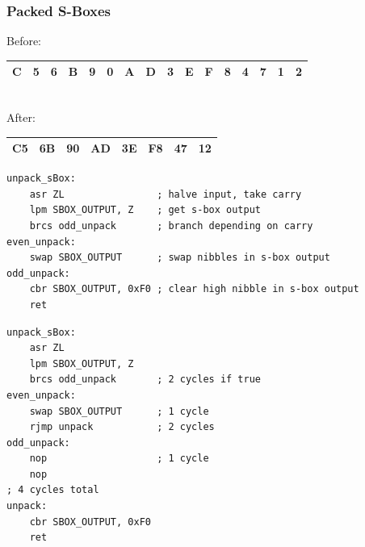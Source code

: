 \documentclass{beamer}
\begin{document}
\begin{frame}[fragile]
\frametitle{Packed S-Boxes}
	\footnotesize{
	Before: \\
	\begin{tabular}{ | C | C | C | C | C | C | C | C | C | C | C | C | C | C | C | C | }
	  \hline                        
	  C & 5 & 6 & B & 9 & 0 & A & D & 3 & E & F & 8 & 4 & 7 & 1 & 2 \\
	  \hline  
	\end{tabular}
	\pause \\

	After: \\
	\begin{tabular}{ | C | C | C | C | C | C | C | C | }
	  \hline                        
	  C5 & 6B & 90 & AD & 3E & F8 & 47 & 12 \\
	  \hline  
	\end{tabular}
	}
\pause
\begin{overprint}
\begin{lstlisting}
unpack_sBox:
    asr ZL                ; halve input, take carry
    lpm SBOX_OUTPUT, Z    ; get s-box output
    brcs odd_unpack       ; branch depending on carry
even_unpack:
    swap SBOX_OUTPUT      ; swap nibbles in s-box output
odd_unpack:
    cbr SBOX_OUTPUT, 0xF0 ; clear high nibble in s-box output
    ret
\end{lstlisting}
\begin{lstlisting}
unpack_sBox:
    asr ZL
    lpm SBOX_OUTPUT, Z
    brcs odd_unpack       ; 2 cycles if true
even_unpack:
    swap SBOX_OUTPUT      ; 1 cycle
    rjmp unpack           ; 2 cycles
odd_unpack:
    nop                   ; 1 cycle
    nop
; 4 cycles total
unpack:
    cbr SBOX_OUTPUT, 0xF0
    ret
\end{lstlisting}
\end{overprint}
\end{frame}
\end{document}
